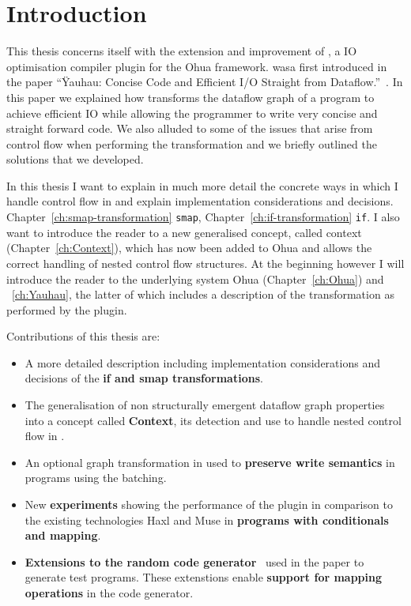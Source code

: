 \chapter{Introduction}

\label{ch:Intro}

This thesis concerns itself with the extension and improvement of \yauhau{}, a IO optimisation compiler plugin for the Ohua framework.
\yauhau{} wasa first introduced in the paper ``Ÿauhau: Concise Code and Efficient I/O Straight from Dataflow.''~\cite{ErtelGoensAdamEtAl2016}.
In this paper we explained how \yauhau{} transforms the dataflow graph of a program to achieve efficient IO while allowing the programmer to write very concise and straight forward code.
We also alluded to some of the issues that arise from control flow when performing the \yauhau{} transformation and we briefly outlined the solutions that we developed.

In this thesis I want to explain in much more detail the concrete ways in which I handle control flow in \yauhau{} and explain implementation considerations and decisions.
Chapter~\ref{ch:smap-transformation} \texttt{smap}, Chapter~\ref{ch:if-transformation} \texttt{if}.
I also want to introduce the reader to a new generalised concept, called context (Chapter~\ref{ch:Context}), which has now been added to Ohua and allows the correct handling of nested control flow structures.
At the beginning however I will introduce the reader to the underlying system Ohua (Chapter~\ref{ch:Ohua}) and \yauhau{}~\ref{ch:Yauhau}, the latter of which includes a description of the transformation as performed by the \yauhau{} plugin.

Contributions of this thesis are:
\begin{itemize}
    \item A more detailed description including implementation considerations and decisions of the \textbf{if and smap transformations}.
    \item The generalisation of non structurally emergent dataflow graph properties into a concept called \textbf{Context}, its detection and use to handle nested control flow in \yauhau{}.
    \item An optional graph transformation in \yauhau{} used to \textbf{preserve write semantics} in programs using the \yauhau{} batching.
    \item New \textbf{experiments} showing the performance of the \yauhau{} plugin in comparison to the existing technologies Haxl and Muse in \textbf{programs with conditionals and mapping}.
    \item \textbf{Extensions to the random code generator}~\cite{Goens-rand-code-graph} used in the \yauhau{} paper to generate test programs.
    These extenstions enable \textbf{support for mapping operations} in the code generator.
\end{itemize}

